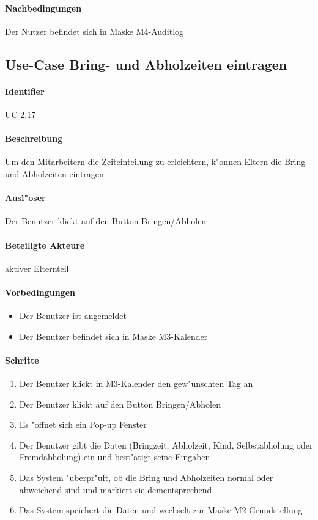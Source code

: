   \paragraph{Nachbedingungen}
  Der Nutzer befindet sich in Maske M4-Auditlog

  
  \newpage
 \subsection{Use-Case Bring- und Abholzeiten eintragen}
  \paragraph{Identifier}
  UC 2.17
  \paragraph{Beschreibung}
  Um den Mitarbeitern die Zeiteinteilung zu erleichtern, k"onnen Eltern die Bring- und Abholzeiten eintragen.
  \paragraph{Ausl"oser}
  Der Benutzer klickt auf den Button \dq Bringen/Abholen\dq
  \paragraph{Beteiligte Akteure}   \leavevmode \newline
    aktiver Elternteil
  \paragraph{Vorbedingungen}
  \begin{itemize}
   \item Der Benutzer ist angemeldet
   \item Der Benutzer befindet sich in Maske M3-Kalender
  \end{itemize}

  \paragraph{Schritte}
  \begin{enumerate}
   \item Der Benutzer klickt in M3-Kalender den gew"unschten Tag an
   \item Der Benutzer klickt auf den Button \dq Bringen/Abholen\dq
   \item Es "offnet sich ein Pop-up Fenster
   \item Der Benutzer gibt die Daten (Bringzeit, Abholzeit, Kind, Selbstabholung oder Fremdabholung) ein und best"atigt seine Eingaben
   \item Das System "uberpr"uft, ob die Bring und Abholzeiten normal oder abweichend sind und markiert sie dementsprechend
   \item Das System speichert die Daten und wechselt zur Maske M2-Grundstellung
  \end{enumerate}

